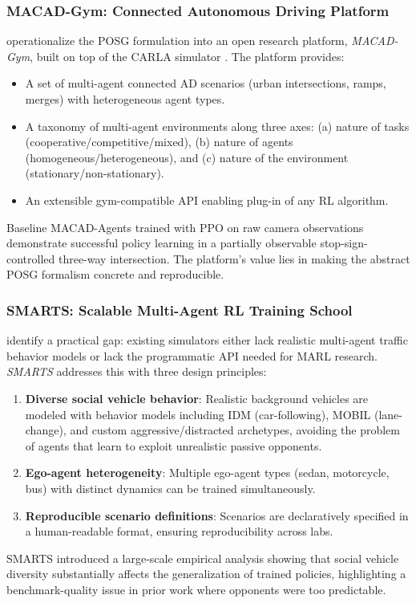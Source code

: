 \documentclass[12pt, a4paper]{article}
\begin{document}
\subsubsection{MACAD-Gym: Connected Autonomous Driving Platform}
\label{sec:macad}

\citet{palanisamy2020multi} operationalize the POSG formulation into an open
research platform, \emph{MACAD-Gym}, built on top of the CARLA simulator
\citep{dosovitskiy2017carlaopenurbandriving}. The platform provides:
\begin{itemize}[noitemsep]
  \item A set of multi-agent connected AD scenarios (urban intersections, ramps,
        merges) with heterogeneous agent types.
  \item A taxonomy of multi-agent environments along three axes: (a) nature of
        tasks (cooperative/competitive/mixed), (b) nature of agents
        (homogeneous/heterogeneous), and (c) nature of the environment
        (stationary/non-stationary).
  \item An extensible gym-compatible API enabling plug-in of any RL algorithm.
\end{itemize}
Baseline MACAD-Agents trained with PPO on raw camera observations demonstrate
successful policy learning in a partially observable stop-sign-controlled
three-way intersection. The platform's value lies in making the abstract POSG
formalism concrete and reproducible.

\subsubsection{SMARTS: Scalable Multi-Agent RL Training School}
\label{sec:smarts}

\citet{zhou2020smarts} identify a practical gap: existing simulators either lack
realistic multi-agent traffic behavior models or lack the programmatic API needed
for MARL research. \emph{SMARTS} addresses this with three design principles:
\begin{enumerate}[noitemsep]
  \item \textbf{Diverse social vehicle behavior}: Realistic background vehicles are
        modeled with behavior models including IDM (car-following), MOBIL
        (lane-change), and custom aggressive/distracted archetypes, avoiding the
        problem of agents that learn to exploit unrealistic passive opponents.
  \item \textbf{Ego-agent heterogeneity}: Multiple ego-agent types (sedan,
        motorcycle, bus) with distinct dynamics can be trained simultaneously.
  \item \textbf{Reproducible scenario definitions}: Scenarios are declaratively
        specified in a human-readable format, ensuring reproducibility across labs.
\end{enumerate}
SMARTS introduced a large-scale empirical analysis showing that social vehicle
diversity substantially affects the generalization of trained policies, highlighting
a benchmark-quality issue in prior work where opponents were too predictable.
\end{document}
